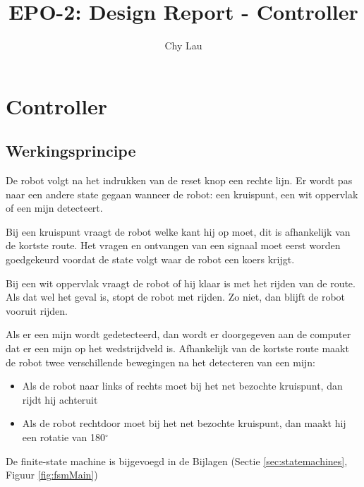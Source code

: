 \documentclass{report}
\title{EPO-2: Design Report - Controller}
\author{Chy Lau}
\begin{document}
\chapter{Controller}
\label{ch:controller}

\section{Werkingsprincipe}
De robot volgt na het indrukken van de reset knop een rechte lijn.
Er wordt pas naar een andere state gegaan wanneer de robot: een kruispunt, een wit oppervlak of een mijn detecteert.


Bij een kruispunt vraagt de robot welke kant hij op moet, dit is afhankelijk van de kortste route.
Het vragen en ontvangen van een signaal moet eerst worden goedgekeurd voordat de state volgt waar de robot een koers krijgt.


Bij een wit oppervlak vraagt de robot of hij klaar is met het rijden van de route.
Als dat wel het geval is, stopt de robot met rijden.
Zo niet, dan blijft de robot vooruit rijden.

Als er een mijn wordt gedetecteerd, dan wordt er doorgegeven aan de computer dat er een mijn op het wedstrijdveld is. 
Afhankelijk van de kortste route maakt de robot twee verschillende bewegingen na het detecteren van een mijn:
\begin{itemize}
\item Als de robot naar links of rechts moet bij het net bezochte kruispunt, dan rijdt hij achteruit
\item Als de robot rechtdoor moet bij het net bezochte kruispunt, dan maakt hij een rotatie van 180$^\circ$
\end{itemize}

De finite-state machine is bijgevoegd in de Bijlagen (Sectie \ref{sec:statemachines}, Figuur \ref{fig:fsmMain})
\end{document}
